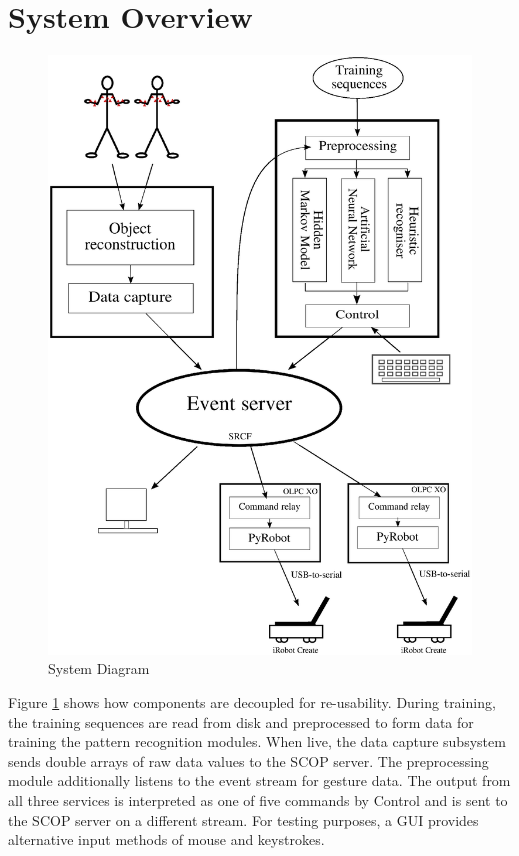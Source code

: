 \documentclass[12pt,a4,notitlepage]{report}
\renewcommand{\_}{\texttt{\symbol{95}}}
\newcommand{\<}{\texttt{\symbol{60}}}
\renewcommand{\>}{\texttt{\symbol{62}}}
\begin{document}
\section{System Overview}

\begin{figure}
\centering
\includegraphics[scale=0.6,angle=0]{diagrams/systemdiagram.ps}
\caption{System Diagram}
\label{sysdiag}
\end{figure}

Figure \ref{sysdiag} shows how components are decoupled for re-usability. During training, the training sequences are read from disk and preprocessed to form data for training the pattern recognition modules. When live, the data capture subsystem sends double arrays of raw data values to the SCOP server. The preprocessing module additionally listens to the event stream for gesture data. The output from all three services is interpreted as one of five commands by Control and is sent to the SCOP server on a different stream. For testing purposes, a GUI provides alternative input methods of mouse and keystrokes.
\end{document}
